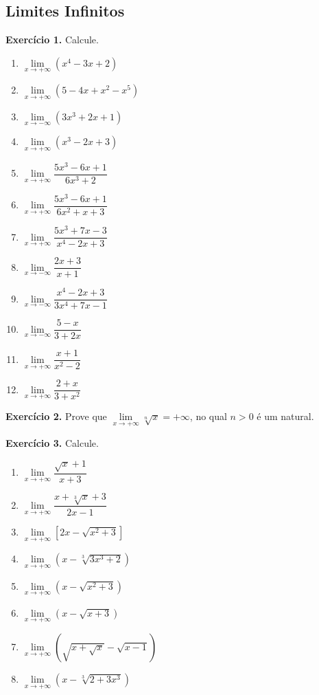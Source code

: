 \documentclass[12pt,a4paper]{article}
\begin{document}
\subsection{Limites Infinitos}
\vspace{0.5cm}
\noindent\textbf{Exercício 1.} Calcule.
\begin{enumerate}
    \renewcommand{\theenumi}{\alph{enumi}}
    \renewcommand{\labelenumi}{\theenumi)}
    \item $\lim\limits_{x \to +\infty} (x^4 - 3x + 2)$
    \item $\lim\limits_{x \to +\infty} (5 - 4x + x^2 - x^5)$
    \item $\lim\limits_{x \to -\infty} (3x^3 + 2x + 1)$
    \item $\lim\limits_{x \to +\infty} (x^3 - 2x + 3)$
    \item $\lim\limits_{x \to +\infty} \dfrac{5x^3 - 6x + 1}{6x^3 + 2}$
    \item $\lim\limits_{x \to +\infty} \dfrac{5x^3 - 6x + 1}{6x^2 + x + 3}$
    \item $\lim\limits_{x \to +\infty} \dfrac{5x^3 + 7x - 3}{x^4 - 2x + 3}$
    \item $\lim\limits_{x \to -\infty} \dfrac{2x + 3}{x + 1}$
    \item $\lim\limits_{x \to -\infty} \dfrac{x^4 - 2x + 3}{3x^4 + 7x - 1}$
    \item $\lim\limits_{x \to -\infty} \dfrac{5 - x}{3 + 2x}$
    \item $\lim\limits_{x \to +\infty} \dfrac{x + 1}{x^2 - 2}$
    \item $\lim\limits_{x \to +\infty} \dfrac{2 + x}{3 + x^2}$
\end{enumerate}

\vspace{0.5cm}
\noindent\textbf{Exercício 2.}
Prove que $\lim\limits_{x \to +\infty} \sqrt[n]{x} = +\infty$, no qual $n > 0$ é um natural.

\vspace{0.5cm}
\noindent\textbf{Exercício 3.} Calcule.
\begin{enumerate}
    \renewcommand{\theenumi}{\alph{enumi}}
    \renewcommand{\labelenumi}{\theenumi)}
    \item $\lim\limits_{x \to +\infty} \dfrac{\sqrt{x} + 1}{x + 3}$
    \item $\lim\limits_{x \to +\infty} \dfrac{x + \sqrt[3]{x} + 3}{2x - 1}$
    \item $\lim\limits_{x \to +\infty} [2x - \sqrt{x^2 + 3}]$
    \item $\lim\limits_{x \to +\infty} (x - \sqrt[3]{3x^3 + 2})$
    \item $\lim\limits_{x \to +\infty} (x - \sqrt{x^2 + 3})$
    \item $\lim\limits_{x \to +\infty} (x - \sqrt{x + 3})$
    \item $\lim\limits_{x \to +\infty} (\sqrt{x + \sqrt{x}} - \sqrt{x - 1})$
    \item $\lim\limits_{x \to +\infty} (x - \sqrt[3]{2 + 3x^3})$
\end{enumerate}
\end{document}
